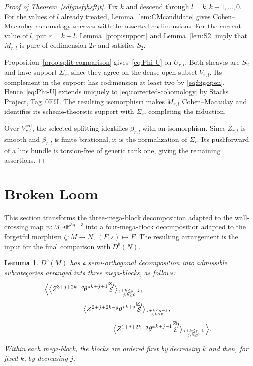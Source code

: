 \documentclass[11pt,letterpaper]{amsart}
\theoremstyle{plain}
\newtheorem{lemma}[theorem]{Lemma}
\theoremstyle{definition}
\theoremstyle{remark}
\numberwithin{equation}{section}
\DeclareMathOperator{\cE}{\mathcal{E}}
\newcommand{\StacksTag}[1]{\href{https://stacks.math.columbia.edu/tag/#1}{Stacks Project, Tag~#1}}
\begin{document}
\begin{proof}[Proof of Theorem~\ref{sdfgnsfghsftjt}]\label{sec:arbitrary-k}
Fix $k$ and descend through $l=k,k-1,\ldots,0$. For the values of $l$
already treated, Lemma~\ref{lem:CMcandidate} gives Cohen--Macaulay
cohomology sheaves with the asserted codimensions.
For the current value of $l$, put $r=k-l$.
Lemma~\ref{prop:support} and Lemma~\ref{lem:S2} imply that
$M_{r,l}$ is pure of codimension $2r$ and satisfies $S_2$.

Proposition~\ref{prop:split-comparison} gives~\eqref{eq:Phi-U}
on $U_{r,l}$. Both sheaves are $S_2$ and have support $\Sigma_r$,
since they agree on the dense open subset $V_{r,l}$.
Its complement in the support has codimension at least two by
\eqref{eq:bigopen}. Hence~\eqref{eq:Phi-U} extends uniquely to
\eqref{eq:corrected-cohomology} by \StacksTag{0E9I}.
The resulting isomorphism makes $M_{r,l}$ Cohen--Macaulay and
identifies its scheme-theoretic support with $\Sigma_r$, completing
the induction.

Over $V_{r,l}^{\mathrm{red}}$, the selected splitting identifies
$\beta_{r,l}$ with an isomorphism. Since $Z_{r,l}$ is smooth and
$\beta_{r,l}$ is finite birational, it is the normalization of
$\Sigma_r$. Its pushforward of a line bundle is torsion-free of
generic rank one, giving the remaining assertions.
\end{proof}



\section{Broken Loom}\label{BrokenLoomSection}

This section transforms the three-mega-block decomposition adapted to the
wall-crossing map $\psi:M\dashrightarrow\mathbb P^{3g-3}$ into a
four-mega-block decomposition adapted to the forgetful  morphism
$
\zeta:M\longrightarrow N$,
$(F,s)\longmapsto F$.
The resulting arrangement is the input for the final comparison with
$D^b(N)$.



\begin{lemma}\label{hgc,cmnvcmvc}
$D^b(M)$ has a semi-orthogonal decomposition into admissible subcategories
arranged into three mega-blocks, as follows:
$$\Bigl\langle
\bigl\langle     Z^{3+j+2k-g}{\theta^*}^{k+j+1}{\cE^{\boxtimes j}}\bigr\rangle_{ j+k\le g-2\atop j,k\ge0},\qquad\qquad\qquad\qquad\qquad$$
\begin{equation}\label{asfvRGqrWRH}
\bigl\langle Z^{2+j+2k-g}{\theta^*}^{k+j}{\cE^{\boxtimes j}}\bigr\rangle_{ j+k\le g-2\atop j,k\ge0},\ 
\end{equation}
$$\qquad\qquad\qquad\qquad\qquad\bigl\langle Z^{1+j+2k-g}{\theta^*}^{k+j-1}{\cE^{\boxtimes j}}\bigr\rangle_{ j+k\le g-1\atop j,k\ge0}
\Bigr\rangle.$$

Within each mega-block, the blocks are ordered first by decreasing $k$ and then, for fixed $k$, by decreasing $j$.
\end{lemma}
\end{document}
